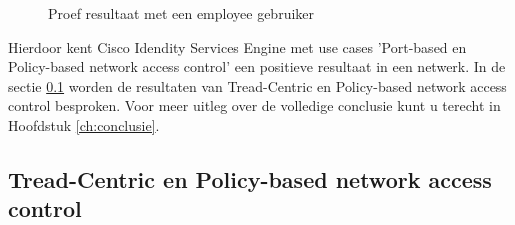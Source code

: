 \begin{figure}[H]
	\centering
	\qquad
	\newline
	\qquad
	\caption{Proef resultaat met een employee gebruiker}%
	\label{fig:Test_gebruiker}%
\end{figure}

Hierdoor kent Cisco Idendity Services Engine met use cases 'Port-based en Policy-based network access control' een positieve resultaat in een netwerk. In de sectie \ref{sec:trepo} worden de resultaten van Tread-Centric en Policy-based network access control besproken. Voor meer uitleg over de volledige conclusie kunt u terecht in Hoofdstuk \ref{ch:conclusie}.


\subsection{Tread-Centric en Policy-based network access control}
\label{sec:trepo}


